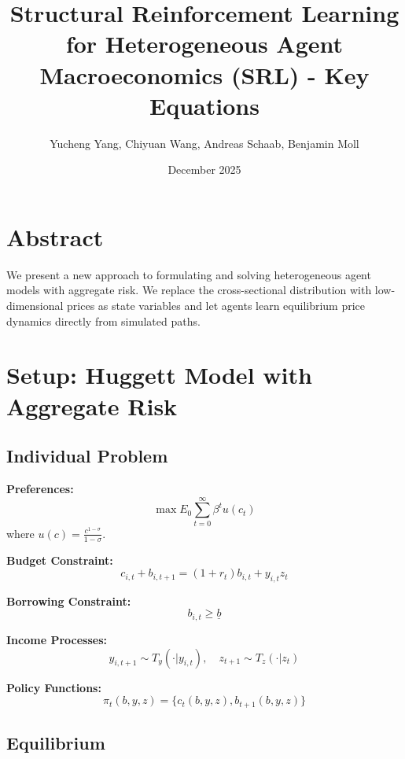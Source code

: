 \documentclass[12pt,a4paper]{article}
\title{Structural Reinforcement Learning for Heterogeneous Agent Macroeconomics (SRL) - Key Equations}
\author{Yucheng Yang, Chiyuan Wang, Andreas Schaab, Benjamin Moll}
\date{December 2025}
\begin{document}
\maketitle

\section{Abstract}

We present a new approach to formulating and solving heterogeneous agent models with aggregate risk. We replace the cross-sectional distribution with low-dimensional prices as state variables and let agents learn equilibrium price dynamics directly from simulated paths.

\section{Setup: Huggett Model with Aggregate Risk}

\subsection{Individual Problem}

\textbf{Preferences:}
\begin{equation}
\max E_0 \sum_{t=0}^{\infty} \beta^t u(c_t)
\end{equation}
where $u(c) = \frac{c^{1-\sigma}}{1-\sigma}$.

\textbf{Budget Constraint:}
\begin{equation}
c_{i,t} + b_{i,t+1} = (1 + r_t)b_{i,t} + y_{i,t} z_t
\end{equation}

\textbf{Borrowing Constraint:}
\begin{equation}
b_{i,t} \geq \underline{b}
\end{equation}

\textbf{Income Processes:}
\begin{equation}
y_{i,t+1} \sim T_y(\cdot|y_{i,t}), \quad z_{t+1} \sim T_z(\cdot|z_t)
\end{equation}

\textbf{Policy Functions:}
\begin{equation}
\pi_t(b, y, z) = \{c_t(b, y, z), b_{t+1}(b, y, z)\}
\end{equation}

\subsection{Equilibrium}
\end{document}
